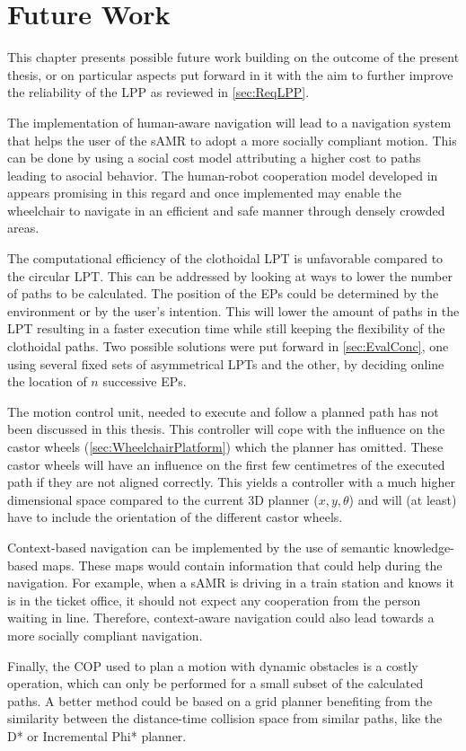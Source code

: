 \chapter{Future Work} \label{cha:FutWork}
This chapter presents possible future work building on the outcome of the present thesis, or on particular aspects put forward in it with the aim to further improve the reliability of the LPP as reviewed in \cref{sec:ReqLPP}.

The implementation of human-aware navigation will lead to a navigation system that helps the user of the sAMR to adopt a more socially compliant motion. This can be done by using a social cost model attributing a higher cost to paths leading to asocial behavior. The human-robot cooperation model developed in \cite{TrautmanKrause2010,TrautmanEtAl2015} appears promising in this regard and once implemented may enable the wheelchair to navigate in an efficient and safe manner through densely crowded areas.

The computational efficiency of the clothoidal LPT is unfavorable compared to the circular LPT. This can be addressed by looking at ways to lower the number of paths to be calculated. The position of the EPs could be determined by the environment or by the user’s intention. This will lower the amount of paths in the LPT resulting in a faster execution time while still keeping the flexibility of the clothoidal paths. Two possible solutions were put forward in \cref{sec:EvalConc}, one using several fixed sets of asymmetrical LPTs and the other, by deciding online the location of $n$ successive EPs.

The motion control unit, needed to execute and follow a planned path has not been discussed in this thesis. This controller will cope with the influence on the castor wheels (\cref{sec:WheelchairPlatform}) which the planner has omitted. These castor wheels will have an influence on the first few centimetres of the executed path if they are not aligned correctly. This yields a controller with a much higher dimensional space compared to the current 3D planner ($x,y,\theta$) and will (at least) have to include the orientation of the different castor wheels.

Context-based navigation can be implemented by the use of semantic knowledge-based maps. These maps would contain information that could help during the navigation. For example, when a sAMR is driving in a train station and knows it is in the ticket office, it should not expect any cooperation from the person waiting in line. Therefore, context-aware navigation could also lead towards a more socially compliant navigation.

\newpage

Finally, the COP used to plan a motion with dynamic obstacles is a costly operation, which can only be performed for a small subset of the calculated paths. A better method could be based on a grid planner benefiting from the similarity between the distance-time collision space from similar paths, like the D* or Incremental Phi* planner.
